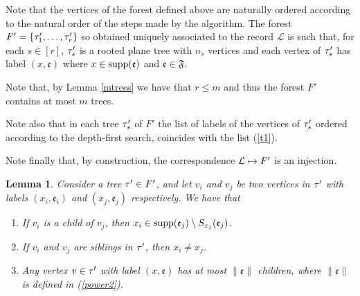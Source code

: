 \documentclass[11pt]{article}
\newtheorem{lem}[theo]{Lemma}
\let\\=\noindent
\let\\=\noindent
\def\obj{{\rm supp}}
\def\ev{{\mathfrak{e}}}
\def\FF{{\mathfrak{F}}}
\begin{document}
\\Note that the vertices of the forest defined above are naturally ordered according to the natural order of the steps made by  the algorithm. The  forest ${ F}'=\{\tau'_1,\dots, \tau'_r\}$ so obtained uniquely associated to the record $\mathcal{L}$ is such  that, for each $s\in [r]$,   $\tau'_s$ is a rooted plane tree with  $n_s$  vertices and each vertex of $\tau'_s$ has label $(x,\ev)$ where $x \in \obj(\ev)$ and $\ev \in \FF$.

\\Note that, by Lemma \ref{mtrees} we have that $r\le m$ and thus the   forest ${ F}'$ contains at most $m$ trees.

\\Note also that in each tree $\tau'_s$ of $F'$ the list of labels of the vertices of $\tau'_s$  ordered according to the depth-first search, coincides with  the list  (\ref{t1}).

\\Note finally that,
by construction, the correspondence ${\cal L}\mapsto F'$ is an injection.



\begin{lem}\label{dr}
Consider a tree $\tau' \in F'$, and let $v_i$ and $v_j$ be two vertices in $\tau'$ with labels $(x_i, \ev_i)$ and $(x_j, \ev_j)$ respectively. We have that

\begin{enumerate}

\item[\rm a)] If $v_i$ is a child of $v_j$, then $x_i \in \obj(\ev_j) \setminus S_{x_j}(\ev_j)$.

\item[\rm b)] If $v_i$ and $v_j$ are siblings in $\tau'$, then $x_i\neq x_j$.%
\item[\rm c)]  Any vertex $v \in \tau'$ with label $(x, \ev)$ has at most $\|\ev\|$ children, where $\|\ev\|$ is defined in (\ref{power2}).
\end{enumerate}
\end{lem}

\\{\it Proof.}
\end{document}
